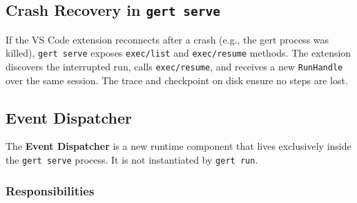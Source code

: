\subsection{Crash Recovery in \texttt{gert serve}}

If the VS Code extension reconnects after a crash (e.g., the gert process was killed),
\texttt{gert serve} exposes \texttt{exec/list} and \texttt{exec/resume} methods. The
extension discovers the interrupted run, calls \texttt{exec/resume}, and receives a new
\texttt{RunHandle} over the same session. The trace and checkpoint on disk ensure no
steps are lost.

\subsection{Event Dispatcher}
\label{sec:event_dispatcher}

The \textbf{Event Dispatcher} is a new runtime component that lives exclusively inside the
\texttt{gert serve} process. It is not instantiated by \texttt{gert run}.

\subsubsection*{Responsibilities}

